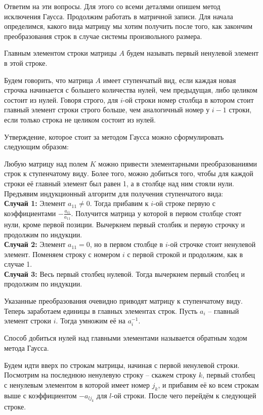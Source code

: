 Ответим на эти вопросы. Для этого со всеми деталями опишем метод исключения Гаусса. Продолжим работать в матричной записи. Для начала определимся, какого вида матрицу мы хотим получить после того, как закончим преобразования строк в случае системы произвольного размера.

\dfn Главным элементом строки матрицы $A$ будем называть первый ненулевой элемент в этой строке.
\edfn

\dfn Будем говорить, что матрица $A$ имеет ступенчатый вид, если каждая новая строчка начинается с большего количества нулей, чем предыдущая, либо целиком состоит из нулей. Говоря строго, для $i$-ой строки номер столбца в котором стоит главный элемент строки строго больше, чем аналогичный  номер у $i-1$ строки, если только строка не целиком состоит из нулей.
\edfn

Утверждение, которое стоит за методом Гаусса можно сформулировать следующим образом:

\thrm Любую матрицу над полем $K$ можно привести элементарными преобразованиями строк к ступенчатому виду. Более того, можно добиться того, чтобы для каждой строки её главный элемент был равен 1, а в столбце над ним стояли нули.
\ethrm
Предъявим индукционный алгоритм для получения ступенчатого вида:\\
{\bf Случай 1:} Элемент $a_{11}\neq 0$. Тогда прибавим к $i$-ой строке первую с коэффициентами $-\frac{a_{i1}}{a_{11}}$. Получится матрица у которой в первом столбце стоят нули, кроме первой позиции. Вычеркнем первый столбик и первую строчку и продолжим по индукции.\\
{\bf Случай 2:} Элемент $a_{11}=0$, но в первом столбце в $i$-ой строчке стоит ненулевой элемент. Поменяем строку с номером $i$ с первой строкой и продолжим, как в случае 1.\\
{\bf Случай 3:} Весь первый столбец нулевой. Тогда вычеркнем первый столбец и продолжим по индукции.


Указанные преобразования очевидно приводят матрицу к ступенчатому виду. 
Теперь заработаем единицы в главных элементах строк. Пусть  $a_i$ -- главный элемент строки $i$. Тогда умножим её на $a_i^{-1}$.

Способ добиться нулей над главными элементами называется обратным ходом метода Гаусса.

Будем идти вверх по строкам матрицы, начиная с первой ненулевой строки. Посмотрим на последнюю ненулевую строку -- скажем строку $k$, первый  столбец с ненулевым элементом в которой имеет номер $j_k$, и прибавим её ко всем строкам выше с коэффициентом $-a_{lj_k}$ для $l$-ой строки. После чего перейдём к следующей строке.\\



